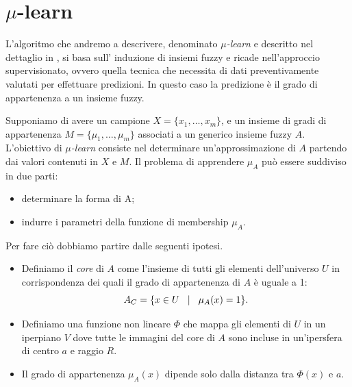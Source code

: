 \documentclass[a4paper,12pt]{report}
\begin{document}
\section{\texorpdfstring{$\mu$}{mu}-learn}
 L’algoritmo che andremo a descrivere, denominato \textit{$\mu$-learn} e descritto nel dettaglio in \cite{mulearn}, si basa sull’ induzione di insiemi fuzzy e ricade nell’approccio supervisionato, ovvero quella tecnica che necessita di dati preventivamente valutati per effettuare predizioni. In questo caso la predizione è il grado di appartenenza a un insieme fuzzy.
\bigskip

Supponiamo di avere un campione $X = \{x_1,\dots,x_m\}$, e un insieme di gradi di appartenenza $ M = \{\mu_1,\dots,\mu_m\}$ associati a un generico insieme fuzzy $A$. L'obiettivo di \textit{$\mu$-learn} consiste nel determinare un'approssimazione di $A$ partendo dai valori contenuti in $X$ e $M$.
Il problema di apprendere $\mu_A$ può essere suddiviso in due parti:
\begin{itemize}
    \item determinare la forma di A;
    \item indurre i parametri della funzione di membership $\mu_A$.
\end{itemize}

\noindent Per fare ciò dobbiamo partire dalle seguenti ipotesi.
\begin{itemize}
    \item  Definiamo il \textit{core} di $A$ come l'insieme di tutti gli elementi dell'universo $U$ in corrispondenza dei quali il grado di appartenenza di $A$ è uguale a 1:
    \begin{equation*}
        A_C = \{ x\in U \hspace{0,3cm} |\hspace{0,3cm} \mu_A(x) = 1 \}.
    \end{equation*}
    \item Definiamo una funzione non lineare $\Phi$  che mappa gli elementi di $U$ in un iperpiano $V$ dove tutte le immagini del core di $A$ sono incluse in un'ipersfera di centro $a$ e raggio $R$.

    \item Il grado di appartenenza $\mu_A(x)$ dipende solo dalla distanza tra $\Phi(x)$ e $a$.
\end{itemize}
\end{document}
